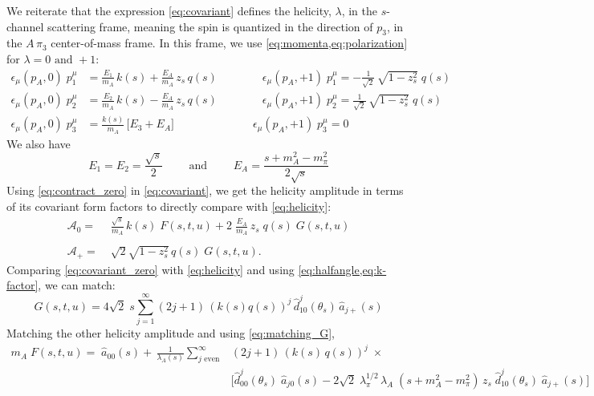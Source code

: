 \documentclass[10pt, aps,prd,amsmath,amssymb,superscriptaddress,onecolumn,
nofootinbib,showpacs,preprintnumbers]{revtex4-1}
\newcommand{\mand}{\qquad \text{ and } \qquad}
\begin{document}
 We reiterate that the expression \cref{eq:covariant} defines the helicity, \(\lambda\), in the \(s\)-channel scattering frame, meaning the spin is quantized in the direction of \(p_3\), in the \(A \, \pi_3\) center-of-mass frame.
 In this frame, we use \cref{eq:momenta,eq:polarization} for \(\lambda = 0 \text{ and } +1 \):
   \begin{align}
     \label{eq:contract_zero}
     \epsilon_\mu(p_A,0) \; p_1^\mu &= \frac{E_1}{m_A} \, k(s) + \frac{E_A}{m_A} \,  z_s \, q(s)
     \qquad \qquad \epsilon_\mu(p_A,+1) \; p_1^\mu = - \frac{1}{\sqrt{2}} \, \sqrt{1 - z_s^2} \; q(s) \nonumber \\
     \epsilon_\mu(p_A,0) \; p_2^\mu &= \frac{E_2}{m_A} \, k(s) - \frac{E_A}{m_A} \,  z_s \, q(s)
     \qquad \qquad \epsilon_\mu(p_A,+1) \; p_2^\mu =  \frac{1}{\sqrt{2}} \, \sqrt{1 - z_s^2} \; q(s)  \\
     \epsilon_\mu(p_A,0) \; p_3^\mu &= \frac{k(s)}{m_A} \, \big[E_3 + E_A \big]
     \qquad \qquad \qquad \quad \epsilon_\mu(p_A,+1) \; p_3^\mu = 0 \nonumber
   \end{align}
 We also have
   \begin{equation}
     \label{eq:energies}
     E_1 = E_2 = \frac{\sqrt{s}}{2} \mand E_A = \frac{s + m_A^2 - m_\pi^2}{2 \sqrt{s}}
   \end{equation}
 Using \cref{eq:contract_zero} in \cref{eq:covariant}, we get the helicity amplitude in terms of its covariant form factors to directly compare with \cref{eq:helicity}:
  \begin{align}
   \label{eq:covariant_zero}
    \mathcal{A}_0 =& \; \frac{\sqrt{s}}{m_A} \, k(s) \; F(s,t,u) + 2 \; \frac{E_A}{m_A} \, z_s \; q(s) \; G(s,t,u) \\
    \nonumber \\
    \label{eq:covariant_plus}
    \mathcal{A}_+ =& \; \sqrt{2} \sqrt{1-z_s^2} \, q(s) \; G(s,t,u).
  \end{align}
 Comparing \cref{eq:covariant_zero} with \cref{eq:helicity} and using \cref{eq:halfangle,eq:k-factor}, we can match:
   \begin{equation}
     \label{eq:matching_G}
     G(s,t,u) =  4 \sqrt{2} \; s \sum_{j = 1}^\infty (2j+1) \, (k(s)q(s))^{j} \,\hat{d}^j_{10}(\theta_s) \, \hat{a}_{j+}(s)
   \end{equation}
 Matching the other helicity amplitude and using \cref{eq:matching_G},
   \begin{align}
     \label{eq:matching_F}
     m_A \; F(s,t,u) = \; \hat{a}_{00}(s) + \, \frac{1}{\lambda_A(s)} \sum_{j \text{ even}}^\infty &(2j+1) \, (k(s)\,q(s))^{j} \; \times \nonumber \\
     &\bigg[ \hat{d}^j_{00}(\theta_s) \; \hat{a}_{j0}(s)
   - 2 \sqrt{2} \; \lambda_\pi^{1/2} \, \lambda_A \; (s + m_A^2 - m_\pi^2)\,  z_s \; \hat{d}^j_{10}(\theta_s) \; \hat{a}_{j+}(s) \bigg]
   \end{align}
\end{document}
